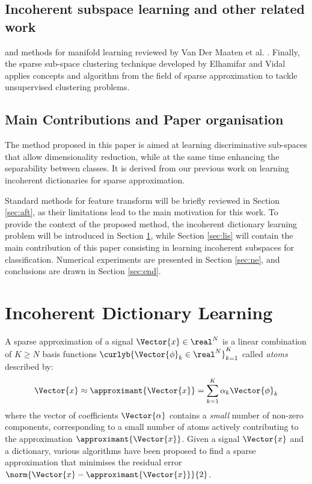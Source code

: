 \documentclass{article}
\def \fea{\Vector{x}} 	%
\def \nDim{N} 			%
\def \nAto{K} 			%
\def \iAto{k} 			%
\def \atom{\Vector{\phi}}%
\def \coeff{\Vector{\alpha}}%
\begin{document}
\subsection{Incoherent subspace learning and other related work}


and methods for manifold learning reviewed by Van Der Maaten et al. \cite{Van-Der-Maaten2009Di}. Finally, the sparse sub-space clustering technique developed by Elhamifar and Vidal \cite{Elhamifar2013Sp} applies concepts and algorithm from the field of sparse approximation to tackle unsupervised clustering problems.


\subsection{Main Contributions and Paper organisation}
The method proposed in this paper is aimed at learning discriminative sub-spaces that allow dimensionality reduction, while at the same time enhancing the separability between classes. It is derived from our previous work on learning incoherent dictionaries for sparse approximation.

Standard methods for feature transform will be briefly reviewed in Section \ref{sec:aft}, as their limitations lead to the main motivation for this work. To provide the context of the proposed method, the incoherent dictionary learning problem will be introduced in Section \ref{sec:idl}, while Section \ref{sec:lis} will contain the main contribution of this paper consisting in learning incoherent subspaces for classification. Numerical experiments are presented in Section \ref{sec:ne}, and conclusions are drawn in Section \ref{sec:end}.

\section{Incoherent Dictionary Learning}\label{sec:idl}
A sparse approximation of a signal $\fea\in\real^{\nDim}$ is a linear combination of $\nAto\geq\nDim$ basis functions $\curlyb{\atom_{\iAto}\in\real^{\nDim}}_{\iAto=1}^{\nAto}$ called \emph{atoms} described by:
\begin{equation}
	\fea \approx \approximant{\fea} = \sum_{\iAto=1}^{\nAto} \alpha_{\iAto}\atom_{\iAto}
\end{equation}
where the vector of coefficients $\coeff$ contains a \emph{small} number of non-zero components, corresponding to a small number of atoms actively contributing to the approximation $\approximant{\fea}$. Given a signal $\fea$ and a dictionary, various algorithms have been proposed to find a sparse approximation that minimises the residual error $\norm{\fea-\approximant{\fea}}{2}$\cite{Elad2010Sp}.
\end{document}
